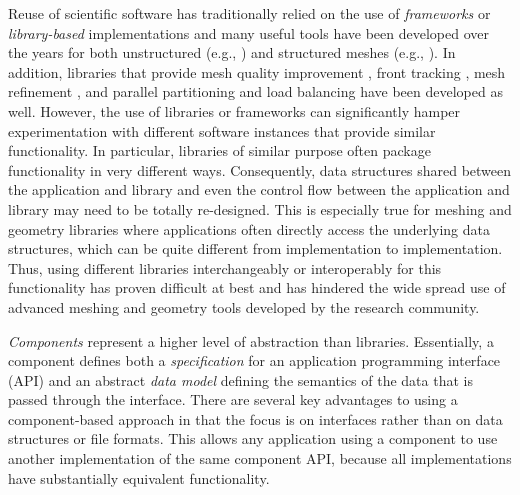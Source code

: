 \documentclass[letterpaper]{jpconf}
\begin{document}
Reuse of scientific software has traditionally relied on the use of
\emph{frameworks} or \emph{library-based} implementations and many
useful tools have been developed over the years for both unstructured
(e.g., \cite{ReSh03,Seol06,moab,GRUMMP:http,nwgrid3}) and structured
meshes (e.g., \cite{chombo,SAMRAI,overture}).  In addition, libraries
that provide mesh quality improvement
\cite{mesquite_download,frei-cfog:ijnme97}, front tracking
\cite{BoFi07}, mesh refinement \cite{LiSh05}, and parallel
partitioning and load balancing \cite{devi02} have been developed as well. 
However, the use of libraries or frameworks can significantly 
hamper experimentation with different software instances that provide
similar functionality.  In particular, libraries of similar purpose
often package functionality in very different ways. Consequently, data
structures shared between the application and library and even the
control flow between the application and library may need to be
totally re-designed.  This is especially true for meshing and geometry
libraries where applications often directly access the underlying data
structures, which can be quite different from implementation to
implementation.  Thus, using different libraries interchangeably or
interoperably for this functionality has proven difficult at best and
has hindered the wide spread use of advanced meshing and geometry
tools developed by the research community.

\emph{Components} represent a higher level of abstraction than libraries.
Essentially, a component defines both a \emph{specification} for an
application programming interface (API) and an abstract \emph{data
model} defining the semantics of the data that is passed through the
interface. There are several key advantages to using a component-based
approach in that the focus is on interfaces rather than on data
structures or file formats.  This allows any application using a
component to use another implementation of the same component API,
because all implementations have substantially equivalent
functionality.  
\end{document}
